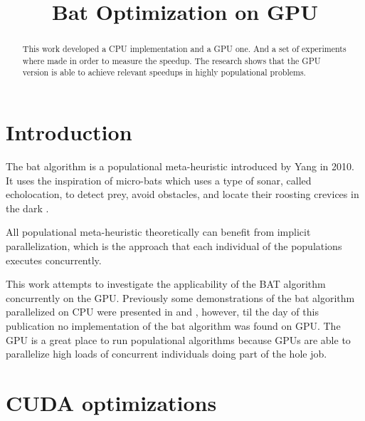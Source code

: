 \documentclass[conference]{IEEEtran}
\begin{document}
\title{Bat Optimization on GPU}

\author{
\and
{}
}

\maketitle
\begin{abstract}
This work developed a CPU implementation and a GPU one. And a set of
experiments where made in order to measure the speedup. The research
shows that the GPU version is able to achieve relevant speedups in
highly populational problems.
\end{abstract}
\IEEEpeerreviewmaketitle

\section{Introduction}

The bat algorithm is a populational meta-heuristic introduced by Yang in
2010. It uses the inspiration of micro-bats which uses a type of sonar,
called echolocation, to detect prey, avoid obstacles, and locate their
roosting crevices in the dark \cite{original}.

All populational meta-heuristic theoretically can benefit from implicit
parallelization, which is the approach that each individual of the
populations executes concurrently.

This work attempts to investigate the applicability of the BAT algorithm
concurrently on the GPU. Previously some demonstrations of the bat
algorithm parallelized on CPU were presented in \cite{paralellCPUFirst}
and \cite{paralellCPU}, however, til the day of this publication no
implementation of the bat algorithm was found on GPU. The GPU is a
great place to run populational algorithms because GPUs are able to
parallelize high loads of concurrent individuals doing part of the hole
job.

\section{CUDA optimizations}
\end{document}
